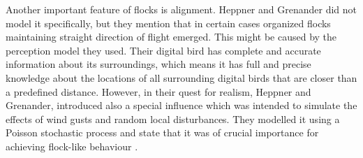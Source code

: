 Another important feature of flocks is alignment. Heppner and Grenander \cite{heppner:1990} did not model it specifically, but they mention that in certain cases organized flocks maintaining straight direction of flight emerged. This might be caused by the perception model they used. Their digital bird has complete and accurate information about its surroundings, which means it has full and precise knowledge about the locations of all surrounding digital birds that are closer than a predefined distance. However, in their quest for realism, Heppner and Grenander, introduced also a special influence which was intended to simulate the effects of wind gusts and random local disturbances. They modelled it using a Poisson stochastic process and state that it was of crucial importance for achieving flock-like behaviour \cite{heppner:1990}.
